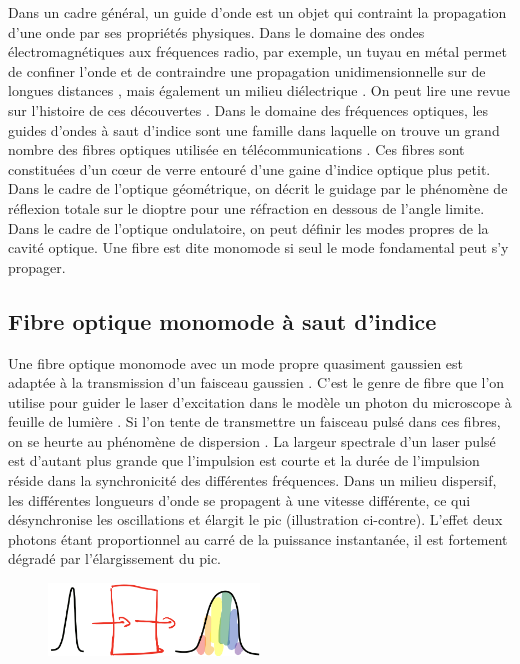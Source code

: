 Dans un cadre général, un guide d'onde est un objet qui contraint la propagation d'une onde par ses propriétés physiques. Dans le domaine des ondes électromagnétiques aux fréquences radio, par exemple, un tuyau en métal permet de confiner l'onde et de contraindre une propagation unidimensionnelle sur de longues distances \cite{miller_low-loss_1953}, mais également un milieu diélectrique \cite{unger_circular_1957}. On peut lire une revue sur l'histoire de ces découvertes \cite{packard_origin_1984}.
Dans le domaine des fréquences optiques, les guides d'ondes à saut d'indice sont une famille dans laquelle on trouve un grand nombre des fibres optiques utilisée en télécommunications \cite{maurer_glass_1973}. Ces fibres sont constituées d'un cœur de verre entouré d'une gaine d'indice optique plus petit. Dans le cadre de l'optique géométrique, on décrit le guidage par le phénomène de réflexion totale sur le dioptre pour une réfraction en dessous de l'angle limite. Dans le cadre de l'optique ondulatoire, on peut définir les modes propres de la cavité optique. Une fibre est dite monomode si seul le mode fondamental peut s'y propager.

\subsection{Fibre optique monomode à saut d'indice} %

Une fibre optique monomode avec un mode propre quasiment gaussien est adaptée à la transmission d'un faisceau gaussien \cite{ankiewicz_generalized_1992}. C'est le genre de fibre que l'on utilise pour guider le laser d'excitation dans le modèle un photon du microscope à feuille de lumière \cite{migault_whole-brain_2018}. Si l'on tente de transmettre un faisceau pulsé dans ces fibres, on se heurte au phénomène de dispersion \cite{gloge_dispersion_1971} \cite{jurgensen_gaussian_1978}. La largeur spectrale d'un laser pulsé est d'autant plus grande que l'impulsion est courte et la durée de l'impulsion réside dans la synchronicité des différentes fréquences. Dans un milieu dispersif, les différentes longueurs d'onde se propagent à une vitesse différente, ce qui désynchronise les oscillations et élargit le pic (illustration ci-contre). L'effet deux photons étant proportionnel au carré de la puissance instantanée, il est fortement dégradé par l'élargissement du pic. %

\begin{figure}
    \vspace{-30pt}
    \begin{flushright}
      \includegraphics[width=0.5\textwidth]{./files/dispersion.svg.png}
    \end{flushright}
  \end{figure}

